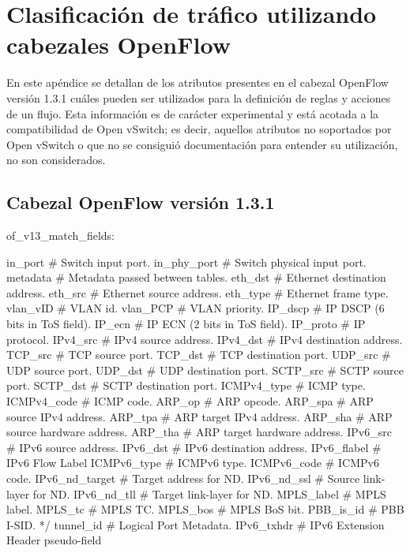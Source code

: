 
\chapter{Clasificaci\'on de tr\'afico utilizando cabezales OpenFlow}
\label{appendix3}

En este ap\'endice se detallan de los atributos presentes en el cabezal OpenFlow versi\'on 1.3.1 cu\'ales pueden ser utilizados para la definici\'on de reglas y acciones de un flujo. Esta informaci\'on es de carácter experimental y est\'a acotada a la compatibilidad de Open vSwitch; es decir, aquellos atributos no soportados por Open vSwitch o que no se consiguió documentaci\'on para entender su utilizaci\'on, no son considerados.

\section{Cabezal OpenFlow versi\'on 1.3.1} 

\begin{python}
of_v13_match_fields:
      
	in_port			# Switch input port.
	in_phy_port 	# Switch physical input port. 
	metadata 		# Metadata passed between tables. 
	eth_dst 		# Ethernet destination address.
	eth_src 		# Ethernet source address. 
	eth_type 		# Ethernet frame type. 
	vlan_vID 		# VLAN id. 
	vlan_PCP		# VLAN priority. 
	IP_dscp 		# IP DSCP (6 bits in ToS field). 
	IP_ecn  		# IP ECN (2 bits in ToS field). 
	IP_proto		# IP protocol. 
	IPv4_src 		# IPv4 source address. 
	IPv4_dst 		# IPv4 destination address. 
	TCP_src 		# TCP source port. 
	TCP_dst 		# TCP destination port. 
	UDP_src 		# UDP source port. 
	UDP_dst 		# UDP destination port. 
	SCTP_src 		# SCTP source port. 
	SCTP_dst 		# SCTP destination port. 
	ICMPv4_type 	# ICMP type. 
	ICMPv4_code 	# ICMP code. 
	ARP_op			# ARP opcode. 
	ARP_spa 		# ARP source IPv4 address. 
	ARP_tpa 		# ARP target IPv4 address. 
	ARP_sha 		# ARP source hardware address. 
	ARP_tha 		# ARP target hardware address. 
	IPv6_src 		# IPv6 source address. 
	IPv6_dst 		# IPv6 destination address. 
	IPv6_flabel 	# IPv6 Flow Label 
	ICMPv6_type 	# ICMPv6 type. 
	ICMPv6_code 	# ICMPv6 code. 
	IPv6_nd_target 	# Target address for ND. 
	IPv6_nd_ssl 	# Source link-layer for ND. 
	IPv6_nd_tll  	# Target link-layer for ND. 
	MPLS_label 		# MPLS label. 
	MPLS_tc 		# MPLS TC. 
	MPLS_bos		# MPLS BoS bit. 
	PBB_is_id 		# PBB I-SID. */
	tunnel_id 		# Logical Port Metadata. 
	IPv6_txhdr 		# IPv6 Extension Header pseudo-field 
		
\end{python}

